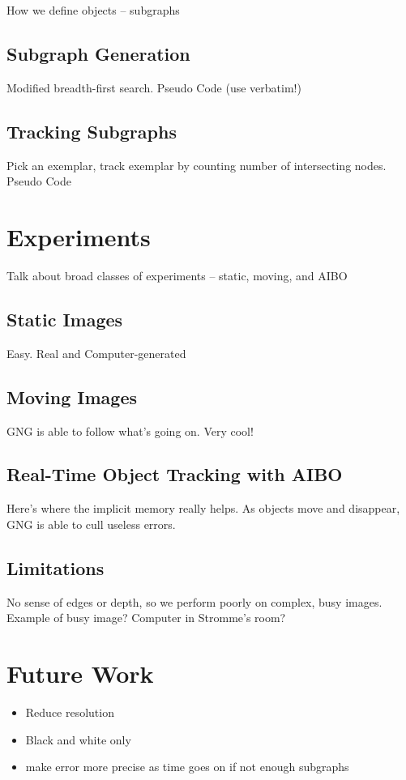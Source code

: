 \documentclass{article}
\begin{document}
How we define objects -- subgraphs

\subsection{Subgraph Generation}

Modified breadth-first search. Pseudo Code (use verbatim!)

\subsection{Tracking Subgraphs}

Pick an exemplar, track exemplar by counting number of intersecting nodes. Pseudo Code

\section{Experiments}

Talk about broad classes of experiments -- static, moving, and AIBO

\subsection{Static Images}

Easy. Real and Computer-generated

\subsection{Moving Images}

GNG is able to follow what's going on. Very cool!

\subsection{Real-Time Object Tracking with AIBO}

Here's where the implicit memory really helps. As objects move and disappear, GNG is able to cull useless errors.

\subsection{Limitations}

No sense of edges or depth, so we perform poorly on complex, busy images. Example of busy image? Computer in Stromme's room?

\section{Future Work}

\begin{itemize}
  \item Reduce resolution
  \item Black and white only
  \item make error more precise as time goes on if not enough subgraphs
\end{itemize}
\end{document}
